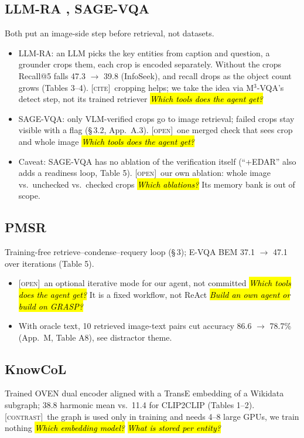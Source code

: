 \documentclass[10pt,a4paper]{article}
\newcommand{\contrast}{\textsc{[contrast]}}
\newcommand{\cit}{\textsc{[cite]}}
\newcommand{\open}{\textsc{[open]}}
\newcommand{\q}[1]{\hl{\footnotesize\itshape #1}}
\begin{document}
\subsection*{LLM-RA \cite{jian2024large}, SAGE-VQA \cite{shen2026sage}}
Both put an image-side step before retrieval, not datasets.
\begin{itemize}
  \item LLM-RA: an LLM picks the key entities from caption and
    question, a grounder crops them, each crop is encoded separately.
    Without the crops Recall@5 falls 47.3 $\to$ 39.8 (InfoSeek), and
    recall drops as the object count grows (Tables 3--4). \cit\
    cropping helps; we take the idea via M$^3$-VQA's detect step, not
    its trained retriever \q{Which tools does the agent get?}
  \item SAGE-VQA: only VLM-verified crops go to image retrieval; failed
    crops stay visible with a flag (\S\,3.2, App.~A.3). \open\ one
    merged check that sees crop and whole image
    \q{Which tools does the agent get?}
  \item Caveat: SAGE-VQA has no ablation of the verification itself
    (``+EDAR'' also adds a readiness loop, Table 5). \open\ our own
    ablation: whole image vs.\ unchecked vs.\ checked crops
    \q{Which ablations?} Its memory bank is out of scope.
\end{itemize}

\subsection*{PMSR \cite{choi2025progressive}}
Training-free retrieve--condense--requery loop (\S\,3); E-VQA BEM
37.1 $\to$ 47.1 over iterations (Table 5).
\begin{itemize}
  \item \open\ an optional iterative mode for our agent, not committed
    \q{Which tools does the agent get?} It is a fixed workflow, not
    ReAct \q{Build an own agent or build on GRASP?}
  \item With oracle text, 10 retrieved image-text pairs cut accuracy
    86.6 $\to$ 78.7\% (App.~M, Table A8), see distractor theme.
\end{itemize}

\subsection*{KnowCoL \cite{zhou2025seeing}}
Trained OVEN dual encoder aligned with a TransE embedding of a Wikidata
subgraph; 38.8 harmonic mean vs.\ 11.4 for CLIP2CLIP (Tables 1--2).
\contrast\ the graph is used only in training and needs 4--8 large
GPUs, we train nothing \q{Which embedding model?} \q{What is stored
per entity?}
\end{document}
